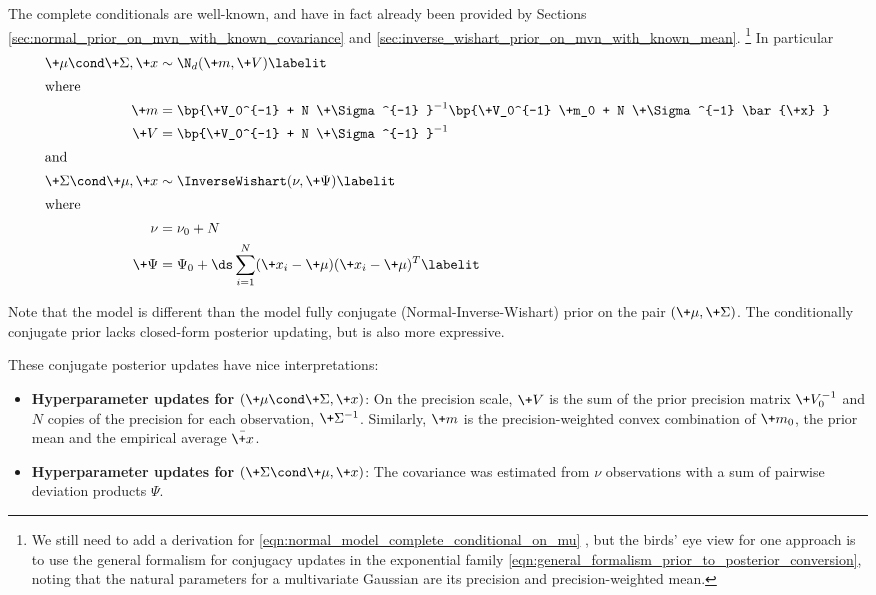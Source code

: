\documentclass{article} %
\begin{document}
The complete conditionals are well-known,  and have in fact already been provided by Sections  \ref{sec:normal_prior_on_mvn_with_known_covariance} and \ref{sec:inverse_wishart_prior_on_mvn_with_known_mean}. \footnote{We still need to add a derivation for \eqref{eqn:normal_model_complete_conditional_on_mu} ,  but the birds' eye view for one approach is to use the general formalism for conjugacy updates in the exponential family \eqref{eqn:general_formalism_prior_to_posterior_conversion},  noting that the natural parameters for a multivariate Gaussian are its precision and precision-weighted mean. }    In particular
\begin{align*}
\+\mu  \cond \+\Sigma, \+x &\sim \N_{d}(\+m,\+V )  \labelit\label{eqn:normal_model_complete_conditional_on_mu} \\
\intertext{where}
\+m  &=  \bp{\+V_0^{-1} + N  \+\Sigma^{-1} }^{-1}  \bp{\+V_0^{-1} \+m_0 + N \+\Sigma^{-1}  \bar{\+x} } \\
\+V &= \bp{\+V_0^{-1} +  N \+\Sigma^{-1} }^{-1} \\
\intertext{and}
\+\Sigma \cond \+\mu,  \+x  &\sim \InverseWishart(\nu,  \+\Psi) 
\labelit \label{eqn:normal_model_complete_conditional_on_Sigma} \\
\intertext{where}
\nu &=  \nu_0 + N \\
\+\Psi &= \Psi_0 + \ds\sum_{i=1}^N  (\+x_i - \+\mu) (\+x_i - \+\mu)^T 
\labelit \label{eqn:Sigma_cc_normal_model_cond_conj_prior}\\ 
\end{align*}

Note that the model is different than the model  fully conjugate (Normal-Inverse-Wishart) prior on the pair $(\+\mu, \+\Sigma)$.   The conditionally conjugate prior lacks closed-form posterior updating,  but is also more expressive. 

These conjugate posterior updates have nice interpretations:
\begin{itemize}
\item \textbf{Hyperparameter updates for $(\+\mu  \cond \+\Sigma, \+x)$}: On the precision scale,  $\+V$ is the sum of the prior precision matrix $\+V_0^{-1}$ and $N$ copies of the precision for each observation,  $\+\Sigma^{-1}$.    Similarly,  $\+m$ is the precision-weighted convex combination of $\+m_0$, the prior mean    and the empirical average $\bar{\+x}$.
\item \textbf{Hyperparameter updates for $(\+\Sigma \cond \+\mu,  \+x)$}:  The covariance was estimated from $\nu$ observations with a sum of pairwise deviation products $\Psi$.
\end{itemize}
\end{document}
